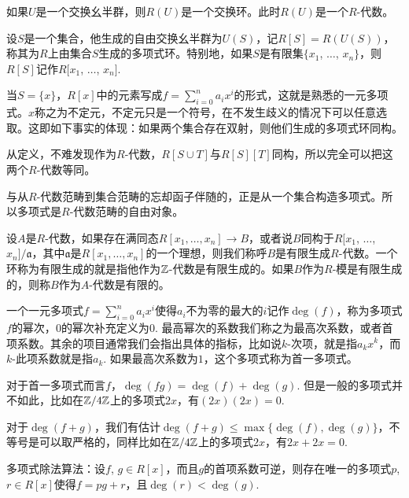 如果$U$是一个交换幺半群，则$R(U)$是一个交换环。此时$R(U)$是一个$R$-代数。

\para 设$S$是一个集合，他生成的自由交换幺半群为$U(S)$，记$R[S]=R(U(S))$，称其为$R$上由集合$S$生成的多项式环。特别地，如果$S$是有限集$\{x_1$, $\dots$, $x_n\}$，则$R[S]$记作$R[x_1$, $\dots$, $x_n]$. 

当$S=\{x\}$，$R[x]$中的元素写成$f=\sum_{i=0}^na_ix^i$的形式，这就是熟悉的一元多项式。$x$称之为不定元，不定元只是一个符号，在不发生歧义的情况下可以任意选取。这即如下事实的体现：如果两个集合存在双射，则他们生成的多项式环同构。

从定义，不难发现作为$R$-代数，$R[S\cup T]$与$R[S][T]$同构，所以完全可以把这两个$R$-代数等同。

与从$R$-代数范畴到集合范畴的忘却函子伴随的，正是从一个集合构造多项式。所以多项式是$R$-代数范畴的自由对象。

\para 设$A$是$R$-代数，如果存在满同态$R[x_1,\dots ,x_n]\to B$，或者说$B$同构于$R[x_1$, $\dots$, $x_n]/\mathfrak{a}$，其中$\mathfrak{a}$是$R[x_1,\dots ,x_n]$的一个理想，则我们称呼$B$是有限生成$R$-代数。一个环称为有限生成的就是指他作为$\mathbb{Z}$-代数是有限生成的。如果$B$作为$R$-模是有限生成的，则称$B$作为$A$-代数是有限的。

\para 一个一元多项式$f=\sum_{i=0}^na_ix^i$使得$a_i$不为零的最大的$i$记作$\deg(f)$，称为多项式$f$的幂次，$0$的幂次补充定义为$0$. 最高幂次的系数我们称之为最高次系数，或者首项系数。其余的项目通常我们会指出具体的指标，比如说$k$-次项，就是指$a_kx^k$，而$k$-此项系数就是指$a_k$. 如果最高次系数为$1$，这个多项式称为首一多项式。

对于首一多项式而言$f$，$\deg(fg)=\deg(f)+\deg(g)$. 但是一般的多项式并不如此，比如在$\mathbb{Z}/4\mathbb{Z}$上的多项式$2x$，有$(2x)(2x)=0$.

对于$\deg(f+g)$，我们有估计$\deg(f+g)\leq \max\{\deg(f),\deg(g)\}$，不等号是可以取严格的，同样比如在$\mathbb{Z}/4\mathbb{Z}$上的多项式$2x$，有$2x+2x=0$.

\begin{thm}
多项式除法算法：设$f$, $g\in R[x]$，而且$g$的首项系数可逆，则存在唯一的多项式$p$, $r\in R[x]$使得$f=pg+r$，且$\deg(r)<\deg(g)$.
\end{thm}


